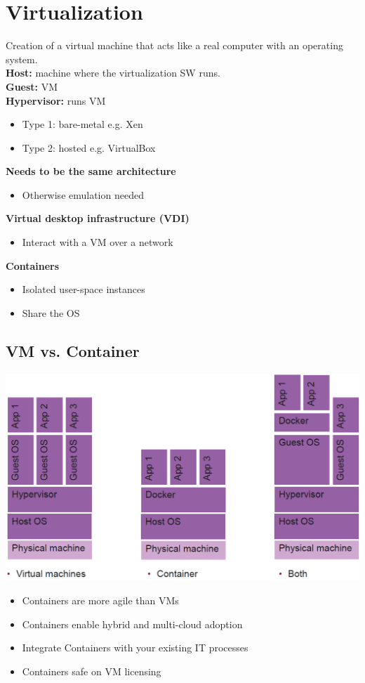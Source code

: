 
\section{Virtualization}
Creation of a virtual machine that acts like a real computer with an operating system.\\
\textbf{Host:} machine where the virtualization SW runs.\\
\textbf{Guest:} VM\\
\textbf{Hypervisor:} runs VM
\begin{itemize}
    \item Type 1: bare-metal e.g. Xen
    \item Type 2: hosted e.g. VirtualBox
\end{itemize}
\textbf{Needs to be the same architecture}
\begin{itemize}
    \item Otherwise emulation needed
\end{itemize}
\textbf{Virtual desktop infrastructure (VDI)}
\begin{itemize}
    \item Interact with a VM over a network
\end{itemize}
\textbf{Containers}
\begin{itemize}
    \item Isolated user-space instances
    \item Share the OS
\end{itemize}

\subsection{VM vs. Container}
\includegraphics[width=\linewidth]{img/vm_container.png}
\begin{itemize}
    \item Containers are more agile than VMs
    \item Containers enable hybrid and multi-cloud adoption
    \item Integrate Containers with your existing IT processes
    \item Containers safe on VM licensing
\end{itemize}

